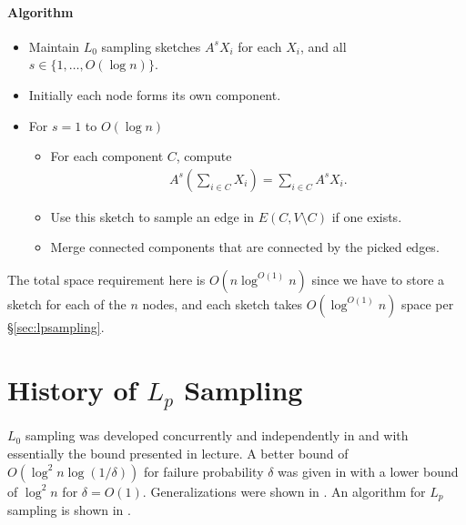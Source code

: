 \documentclass[11pt]{article}
\begin{document}
\paragraph{Algorithm}
\begin{itemize}
\item Maintain $L_0$ sampling sketches $A^s X_i$ for each $X_i$, and all $s \in \{1, \ldots, O(\log n)\}$.
\item Initially each node forms its own component.
\item For $s = 1$ to $O(\log n)$
  \begin{itemize}
  \item For each component $C$, compute
    \begin{align*}
      A^s\left(\sum_{i \in C} X_i\right) = \sum_{i \in C} A^s X_i.
    \end{align*}
  \item Use this sketch to sample an edge in $E(C, V\setminus C)$ if one exists.
  \item Merge connected components that are connected by the picked edges.
  \end{itemize}
\end{itemize}

The total space requirement here is $O(n\log^{O(1)} n)$ since we have to store a sketch for each of the $n$ nodes, and each sketch takes $O(\log^{O(1)} n)$ space per \S\ref{sec:lpsampling}.

\section{History of $L_p$ Sampling}

$L_0$ sampling was developed concurrently and independently in \cite{Cormode:2005:SMI:1083592.1083599} and \cite{doi:10.1142/S0218195908002520} with essentially the bound presented in lecture. A better bound of $O(\log^2 n \log (1/\delta))$ for failure probability $\delta$ was given in \cite{jowhari2011tight} with a lower bound of $\log^2 n$ for $\delta = O(1)$. Generalizations were shown in \cite{kapralov2017optimal}. An algorithm for $L_p$ sampling is shown in \cite{monemizadeh20101}.
\end{document}
